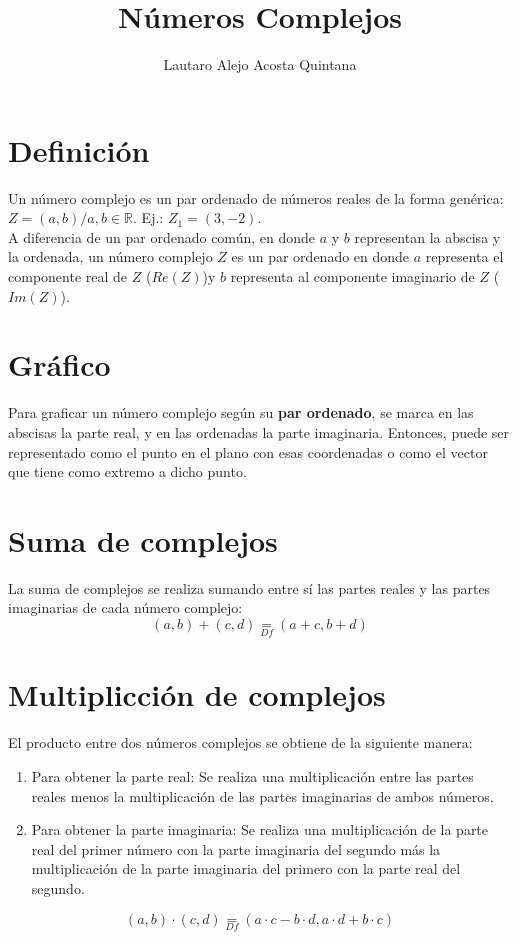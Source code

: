\documentclass[12pt, twocolumn]{article}
\title{Números Complejos}
\author{Lautaro Alejo Acosta Quintana}
\begin{document}
\maketitle
\section{Definición}
Un número complejo es un par ordenado de números reales de la forma genérica: $\boxed{Z=(a,b)/a,b \in \mathbb{R}}$. Ej.: $Z_1=(3,-2).$\\
A diferencia de un par ordenado común, en donde $a$ y $b$ representan la abscisa y la ordenada, un número complejo $Z$ es un par ordenado en donde $a$ representa el componente real de $Z$ ($Re(Z)$)y $b$ representa al componente imaginario de $Z$ ($Im(Z)$).

\section{Gráfico}
Para graficar un número complejo según su \textbf{par ordenado}, se marca en las abscisas la parte real, y en las ordenadas la parte imaginaria. Entonces, puede ser representado como el punto en el plano con esas coordenadas o como el vector que tiene como extremo a dicho punto.

\section{Suma de complejos}
La suma de complejos se realiza sumando entre sí las partes reales y las partes imaginarias de cada número complejo:
$$ \boxed{(a,b) + (c,d)\underset{Df}{=}(a+c,b+d) }$$
\section{Multiplicción de complejos}
El producto entre dos números complejos se obtiene de la siguiente manera:
\begin{enumerate}
    \item Para obtener la parte real: Se realiza una multiplicación entre las partes reales menos la multiplicación de las partes imaginarias de ambos números.
    \item Para obtener la parte imaginaria: Se realiza una multiplicación de la parte real del primer número con la parte imaginaria del segundo más la multiplicación de la parte imaginaria del primero con la parte real del segundo.
\end{enumerate}
$$\boxed{(a,b)\cdot(c,d) \underset{Df}{=} (a\cdot c-b\cdot d,a\cdot d + b\cdot c)}$$
\end{document}
